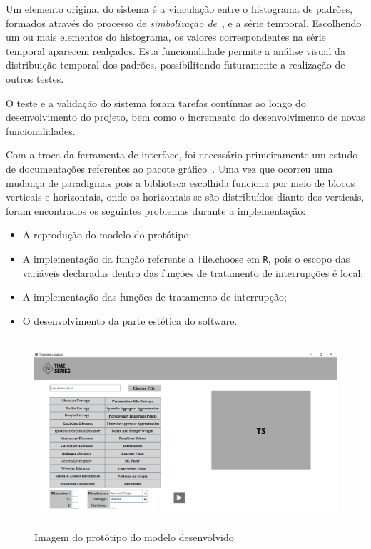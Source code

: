 Um elemento original do sistema é a vinculação entre o histograma de padrões, formados através do processo de \textit{simbolização de}~\cite{article2}, e a série temporal. 
Escolhendo um ou mais elementos do histograma, os valores correspondentes na série temporal aparecem realçados. 
Esta funcionalidade permite a análise visual da distribuição temporal dos padrões, possibilitando futuramente a realização de outros testes.
 
O teste e a validação do sistema foram tarefas contínuas ao longo do desenvolvimento do projeto, bem como o incremento do desenvolvimento de novas funcionalidades. 

Com a troca da ferramenta de interface, foi necessário primeiramente um estudo de documentações referentes ao pacote gráfico~\cite{rgtk2}. 
Uma vez que ocorreu uma mudança de paradigmas pois a biblioteca escolhida funciona por meio de blocos verticais e horizontais, onde os horizontais se são distribuídos diante dos verticais, foram encontrados os seguintes problemas durante a implementação:

\begin{itemize}
\item A reprodução do modelo do protótipo;
\item A implementação da função referente a \texttt file.choose em \texttt R, pois o escopo das variáveis declaradas dentro das funções de tratamento de interrupções é local;
\item A implementação das funções de tratamento de interrupção;
\item O desenvolvimento da parte estética do software.
\end{itemize}

\begin{figure}
  \centering
  \caption{Imagem do protótipo do modelo desenvolvido}
   \includegraphics[width=15cm,height=7cm]{imagens/tela4.png}
\end{figure}

